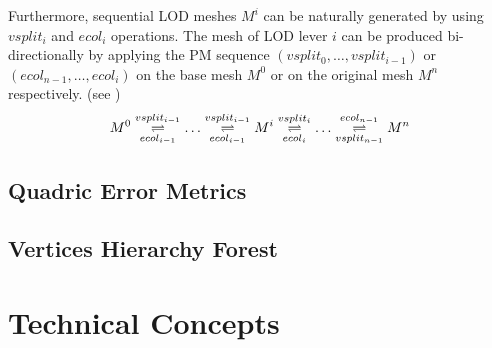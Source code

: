 Furthermore, sequential LOD meshes $M^i$ can be naturally generated by using $vsplit_i$ and $ecol_i$ operations. The mesh of LOD lever $i$ can be produced bi-directionally by applying the PM sequence $(vsplit_0,\ldots,vsplit_{i-1})$ or $(ecol_{n-1},\ldots,ecol_{i})$ on the base mesh $M^0$ or on the original mesh $M^n$ respectively. (see )
$$
	M^0\underset{ecol_{i-1}}{\overset{vsplit_{i-1}}\rightleftharpoons}\ldots\underset{ecol_{i-1}}{\overset{vsplit_{i-1}}\rightleftharpoons}M^i\underset{ecol_i}{\overset{vsplit_i}\rightleftharpoons}\ldots\underset{vsplit_{n-1}}{\overset{ecol_{n-1}}\rightleftharpoons}M^n
$$



\subsection{Quadric Error Metrics}
\label{subsection:theoreticalQEM}


\subsection{Vertices Hierarchy Forest}
\label{subsection:theoreticalVHF}


\section{Technical Concepts}
\label{section:TechConcpt}




